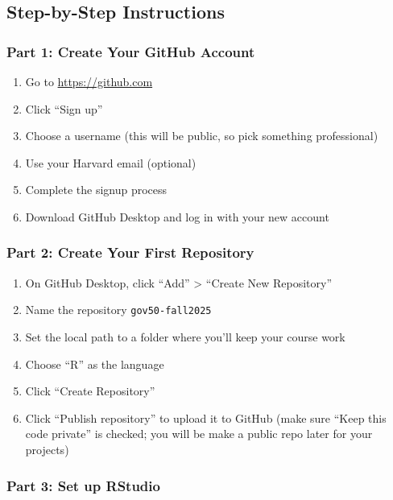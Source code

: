 \documentclass[
  11pt,
  letterpaper]{article}
\providecommand{\tightlist}{%
  \setlength{\itemsep}{0pt}\setlength{\parskip}{0pt}}
\begin{document}
\subsection{Step-by-Step Instructions}\label{step-by-step-instructions}

\subsubsection{Part 1: Create Your GitHub
Account}\label{part-1-create-your-github-account}

\begin{enumerate}
\def\labelenumi{\arabic{enumi}.}
\tightlist
\item
  Go to \url{https://github.com}
\item
  Click ``Sign up''
\item
  Choose a username (this will be public, so pick something
  professional)
\item
  Use your Harvard email (optional)
\item
  Complete the signup process
\item
  Download GitHub Desktop and log in with your new account
\end{enumerate}

\subsubsection{Part 2: Create Your First
Repository}\label{part-2-create-your-first-repository}

\begin{enumerate}
\def\labelenumi{\arabic{enumi}.}
\tightlist
\item
  On GitHub Desktop, click ``Add'' \textgreater{} ``Create New
  Repository''
\item
  Name the repository \texttt{gov50-fall2025}
\item
  Set the local path to a folder where you'll keep your course work
\item
  Choose ``R'' as the language
\item
  Click ``Create Repository''
\item
  Click ``Publish repository'' to upload it to GitHub (make sure ``Keep
  this code private'' is checked; you will be make a public repo later
  for your projects)
\end{enumerate}

\subsubsection{Part 3: Set up RStudio}\label{part-3-set-up-rstudio}
\end{document}
